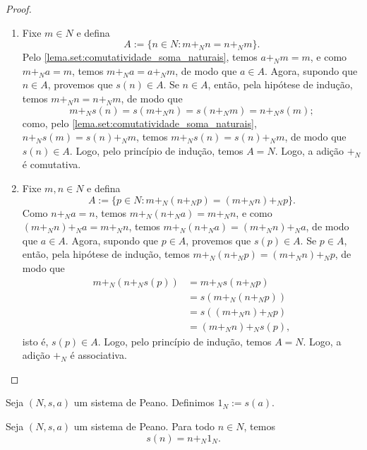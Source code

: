 \begin{proof}
    \leavevmode
        \begin{enumerate}[leftmargin=*, align=left, label=\textbf{(\alph*)}]
            \item Fixe $m \in N$ e defina
                \[
                    A := \{n \in N : m +_N n = n +_N m\}.
                \]
            Pelo \cref{lema.set:comutatividade_soma_naturais}, temos $a +_N m = m$, e como $m +_N a = m$, temos $m +_N a = a +_N m$, de modo que $a \in A$. Agora, supondo que $n \in A$, provemos que $s(n) \in A$. Se $n \in A$, então, pela hipótese de indução, temos $m +_N n = n +_N m$, de modo que
                \[
                    m +_N s(n) = s(m +_N n) = s(n +_N m) = n +_N s(m);
                \]
            como, pelo \cref{lema.set:comutatividade_soma_naturais}, $n +_N s(m) = s(n) +_N m$, temos $m +_N s(n) = s(n) +_N m$, de modo que $s(n) \in A$. Logo, pelo princípio de indução, temos $A = N$. Logo, a adição $+_N$ é comutativa. \blackproof
            \item Fixe $m,n \in N$ e defina
                \[
                    A := \{p \in N : m +_N (n +_N p) = (m +_N n) +_N p\}.    
                \]
            Como $n +_N a = n$, temos $m +_N (n +_N a) = m +_N n$, e como $(m +_N n) +_N a = m +_N n$, temos $m +_N (n +_N a) = (m +_N n) +_N a$, de modo que $a \in A$. Agora, supondo que $p \in A$, provemos que $s(p) \in A$. Se $p \in A$, então, pela hipótese de indução, temos $m +_N (n +_N p) = (m +_N n) +_N p$, de modo que
                \begin{align*}
                    m +_N (n +_N s(p)) &= m +_N s(n +_N p) \\
                    &= s(m +_N (n +_N p)) \\
                    &= s((m +_N n) +_N p) \\
                    &= (m +_N n) +_N s(p),
                \end{align*}
            isto é, $s(p) \in A$. Logo, pelo princípio de indução, temos $A = N$. Logo, a adição $+_N$ é associativa. \blackproof
        \end{enumerate}
\end{proof}

\begin{definition}
    Seja $(N,s,a)$ um sistema de Peano. Definimos $1_N := s(a)$.
\end{definition}

\begin{proposition}
    Seja $(N,s,a)$ um sistema de Peano. Para todo $n \in N$, temos
        \[
            s(n) = n +_N 1_N.
        \]
\end{proposition}

